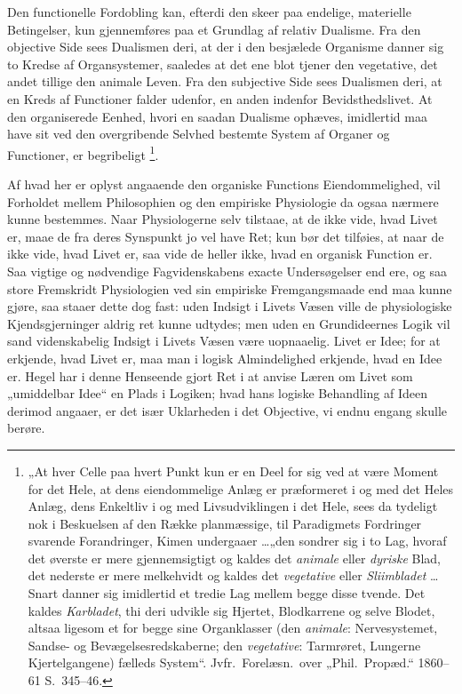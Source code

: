 \documentclass[12pt]{book}
\newcommand{\opage}[1]{\marginnote{\footnotesize\textit{[#1]}}}
\begin{document}
Den functionelle Fordobling kan, efterdi den skeer paa endelige, materielle Betingelser, kun
gjennemføres paa et Grundlag af relativ Dualisme. Fra den objective Side sees Dualismen deri, at
der i den besjælede Organisme danner sig to Kredse af Organsystemer, saaledes at det ene blot
tjener den vegetative, det andet tillige den animale Leven. Fra den
\opage{405} subjective Side sees Dualismen deri, at en Kreds af Functioner falder udenfor, en anden indenfor
Bevidsthedslivet. At den organiserede Eenhed, hvori en saadan Dualisme ophæves, imidlertid maa
have sit ved den overgribende Selvhed bestemte System af Organer og Functioner, er begribeligt%
\footnote{„At hver Celle paa hvert Punkt kun er en Deel for sig ved at være Moment for det Hele,
  at dens eiendommelige Anlæg er præformeret i og med det Heles Anlæg, dens Enkeltliv i og med
  Livsudviklingen i det Hele, sees da tydeligt nok i Beskuelsen af den Række planmæssige, til
  Paradigmets Fordringer svarende Forandringer, Kimen undergaaer \ldots „den sondrer sig i to Lag,
  hvoraf det øverste er mere gjennemsigtigt og kaldes det \emph{animale} eller \emph{dyriske}
  Blad, det nederste er mere melkehvidt og kaldes det \emph{vegetative} eller \emph{Sliimbladet}
  \ldots Snart danner sig imidlertid et tredie Lag mellem begge disse tvende. Det kaldes
  \emph{Karbladet}, thi deri udvikle sig Hjertet, Blodkarrene og selve Blodet, altsaa ligesom et
  for begge sine Organklasser (den \emph{animale}: Nervesystemet, Sandse- og
  Bevægelsesredskaberne; den \emph{vegetative}: Tarmrøret, Lungerne Kjertelgangene) fælleds
  System“. Jvfr.\ Forelæsn.\ over „Phil.\ Propæd.“ 1860--61 S.~345--46.}.

Af hvad her er oplyst angaaende den organiske Functions Eiendommelighed, vil Forholdet mellem
Philosophien og den empiriske Physiologie da ogsaa nærmere kunne bestemmes. Naar Physiologerne
selv tilstaae, at de ikke vide, hvad Livet er, maae de fra deres Synspunkt jo vel have Ret; kun
bør det tilføies, at naar de ikke vide, hvad Livet er, saa vide de heller ikke, hvad en organisk
Function er. Saa vigtige og nødvendige Fagvidenskabens exacte Undersøgelser end ere, og saa store
Fremskridt Physiologien ved sin empiriske Fremgangsmaade end maa kunne gjøre, saa staaer dette
dog fast: uden Indsigt i Livets Væsen ville de physiologiske Kjendsgjerninger aldrig ret kunne
udtydes; men uden en Grundideernes Logik vil sand videnskabelig Indsigt i Livets Væsen være
uopnaaelig. Livet er Idee; for at erkjende, hvad Livet er, maa man i
\opage{406} logisk Almindelighed erkjende, hvad en Idee er. Hegel har i denne Henseende gjort Ret i at anvise
Læren om Livet som „umiddelbar Idee“ en Plads i Logiken; hvad hans logiske Behandling af Ideen
derimod angaaer, er det især Uklarheden i det Objective, vi endnu engang skulle berøre.
\end{document}
